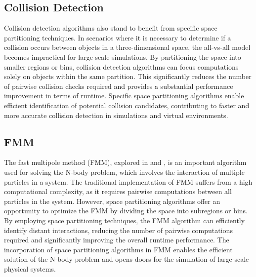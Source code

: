 \documentclass{juliacon}
\begin{document}
\subsection{Collision Detection}
Collision detection algorithms also stand to benefit from specific space
partitioning techniques. In scenarios where it is necessary to determine if a
collision occurs between objects in a three-dimensional space, the all-vs-all
model becomes impractical for large-scale simulations. By partitioning the
space into smaller regions or bins, collision detection algorithms can focus
computations solely on objects within the same partition. This significantly
reduces the number of pairwise collision checks required and provides a
substantial performance improvement in terms of runtime. Specific space
partitioning algorithms enable efficient identification of potential collision
candidates, contributing to faster and more accurate collision detection in
simulations and virtual environments.

\subsection{FMM}

The fast multipole method (FMM), explored in \cite{FMM} and \cite{AMM}, is an
important algorithm used for solving the N-body problem, which involves the
interaction of multiple particles in a system. The traditional implementation
of FMM suffers from a high computational complexity, as it requires pairwise
computations between all particles in the system. However, space partitioning
algorithms offer an opportunity to optimize the FMM by dividing the space into
subregions or bins. By employing space partitioning techniques, the FMM
algorithm can efficiently identify distant interactions, reducing the number of
pairwise computations required and significantly improving the overall runtime
performance. The incorporation of space partitioning algorithms in FMM enables
the efficient solution of the N-body problem and opens doors for the simulation
of large-scale physical systems.
\end{document}
